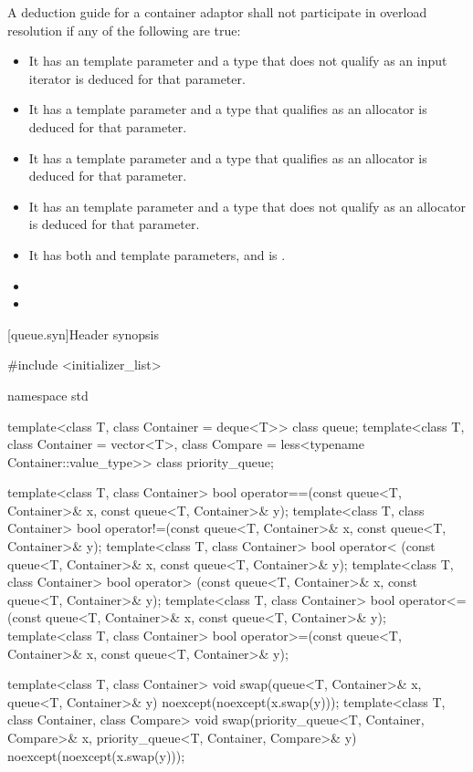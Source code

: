 \pnum
A deduction guide for a container adaptor shall not participate in overload resolution if any of the following are true:
\begin{itemize}
\item It has an  template parameter and a type that does not qualify as an input iterator is deduced for that parameter.
\item It has a  template parameter and a type that qualifies as an allocator is deduced for that parameter.
\item It has a  template parameter and a type that qualifies as an allocator is deduced for that parameter.
\item It has an  template parameter and a type that does not qualify as an allocator is deduced for that parameter.
\item It has both  and  template parameters, and  is .
\item {}
\item {}
\end{itemize}

[queue.syn]{Header  synopsis}%
%

\begin{codeblock}
#include <initializer_list>

namespace std {
  template<class T, class Container = deque<T>> class queue;
  template<class T, class Container = vector<T>,
           class Compare = less<typename Container::value_type>>
    class priority_queue;

  template<class T, class Container>
    bool operator==(const queue<T, Container>& x, const queue<T, Container>& y);
  template<class T, class Container>
    bool operator!=(const queue<T, Container>& x, const queue<T, Container>& y);
  template<class T, class Container>
    bool operator< (const queue<T, Container>& x, const queue<T, Container>& y);
  template<class T, class Container>
    bool operator> (const queue<T, Container>& x, const queue<T, Container>& y);
  template<class T, class Container>
    bool operator<=(const queue<T, Container>& x, const queue<T, Container>& y);
  template<class T, class Container>
    bool operator>=(const queue<T, Container>& x, const queue<T, Container>& y);

  template<class T, class Container>
    void swap(queue<T, Container>& x, queue<T, Container>& y) noexcept(noexcept(x.swap(y)));
  template<class T, class Container, class Compare>
    void swap(priority_queue<T, Container, Compare>& x,
              priority_queue<T, Container, Compare>& y) noexcept(noexcept(x.swap(y)));
}
\end{codeblock}

